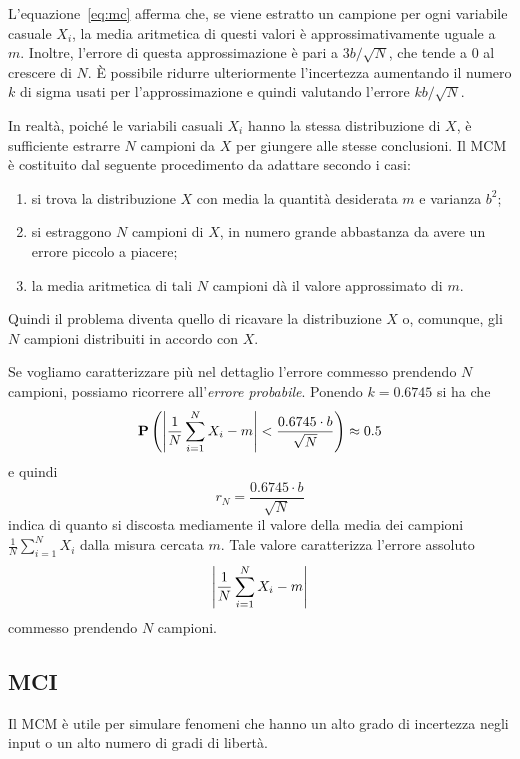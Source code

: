 L'equazione~\eqref{eq:mc} afferma che, se viene estratto un campione per ogni
variabile casuale $X_i$, la media aritmetica di questi valori \`e
approssimativamente uguale a $m$. Inoltre, l'errore di questa
approssimazione \`e pari a $3b/\sqrt{N}$, che tende a $0$ al crescere
di $N$. \`E possibile ridurre ulteriormente l'incertezza
aumentando il numero $k$ di sigma usati per l'approssimazione e
quindi valutando l'errore $kb/\sqrt{N}$.

In realt\`a, poich\'e le variabili casuali $X_i$ hanno la stessa
distribuzione di $X$, \`e sufficiente estrarre $N$ campioni da $X$ per
giungere alle stesse conclusioni.
Il \ac{MCM} \`e costituito
dal seguente procedimento da adattare secondo i casi:
\begin{enumerate}
\item si trova la distribuzione $X$ con media la quantit\`a desiderata
  $m$ e varianza $b^2$;
\item si estraggono $N$ campioni di $X$, in numero grande abbastanza
  da avere un errore piccolo a piacere;
\item la media aritmetica di tali $N$ campioni d\`a il valore
  approssimato di $m$.
\end{enumerate}
Quindi il problema diventa quello di ricavare la distribuzione $X$ o,
comunque, gli $N$ campioni distribuiti in accordo con $X$.

Se vogliamo caratterizzare pi\`u nel dettaglio l'errore commesso
prendendo $N$ campioni, possiamo ricorrere all'\emph{errore
  probabile}. Ponendo $k=0.6745$ si ha che 
\begin{equation*}
  \mathrm{\textbf{P}}\left(\left|\frac{1}{N}\sum_{i=1}^NX_i-m\right| <\frac{0.6745\cdot b}{\sqrt{N}}\right)\approx 0.5
\end{equation*}
e quindi 
\begin{equation*}
  r_N = \frac{0.6745\cdot b}{\sqrt{N}}
\end{equation*}
 indica di quanto si discosta mediamente il
valore della media dei campioni $\frac{1}{N}\sum_{i=1}^NX_i$ dalla misura cercata
$m$. Tale valore caratterizza l'errore assoluto
\begin{equation*}
\left|\frac{1}{N}\sum_{i=1}^NX_i-m\right|  
\end{equation*}
commesso prendendo $N$ campioni.

\subsection{\acf{MCI}}
Il \ac{MCM} \`e utile per simulare fenomeni che hanno un alto grado di
incertezza negli input o un alto numero di gradi di libert\`a.

